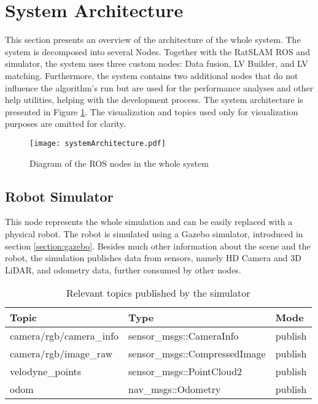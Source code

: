 \section{System Architecture}\label{section:systemArchitecture}

This section presents an overview of the architecture of the whole system. The system is decomposed into several Nodes. Together with the  RatSLAM ROS and simulator, the system uses three custom nodes: Data fusion, LV Builder, and LV matching. Furthermore, the system contains two additional nodes that do not influence the algorithm's run but are used for the performance analyses and other help utilities, helping with the development process. The system architecture is presented in Figure \ref{fig:systemArchitecture}. The visualization and topics used only for visualization purposes are omitted for clarity.

\begin{figure}[htpb]
    \centering
    \texttt{[image: systemArchitecture.pdf]}
    \caption{Diagram of the ROS nodes in the whole system} \label{fig:systemArchitecture}
\end{figure}

\subsection{Robot Simulator}

This node represents the whole simulation and can be easily replaced with a physical robot. The robot is simulated using a Gazebo simulator, introduced in section \ref{section:gazebo}. Besides much other information about the scene and the robot, the simulation publishes data from sensors, namely HD Camera and 3D LiDAR, and odometry data, further consumed by other nodes.

\begin{table}[htpb]
    \caption{Relevant topics published by the simulator}\label{tab:robotSimulatorTopics}
    \centering
    \begin{tabular}{l l l}
        \toprule
        Topic                   & Type                          & Mode    \\
        \midrule
        camera/rgb/camera\_info & sensor\_msgs::CameraInfo      & publish \\
        camera/rgb/image\_raw   & sensor\_msgs::CompressedImage & publish \\
        velodyne\_points        & sensor\_msgs::PointCloud2     & publish \\
        odom                    & nav\_msgs::Odometry           & publish \\
        \bottomrule
    \end{tabular}
\end{table}

